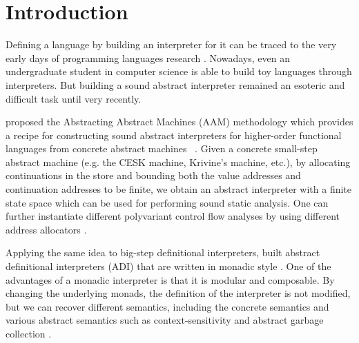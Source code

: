 \documentclass[acmsmall]{acmart}\settopmatter{}
\begin{document}


\maketitle


\section{Introduction}

Defining a language by building an interpreter for it can be traced to the very
early days of programming languages research \cite{landin1966next, reynolds1972definitional}.
Nowadays, even an undergraduate student in computer science is able to build toy languages
through interpreters.
But building a sound abstract interpreter remained an esoteric and difficult task until very recently.

\citeauthor{van2012systematic} proposed the Abstracting Abstract Machines (AAM) methodology which provides a recipe
for constructing sound abstract interpreters for higher-order functional languages from concrete abstract machines
~\cite{van2012systematic, van2010abstracting}.
Given a concrete small-step abstract machine (e.g. the CESK machine, Krivine's machine, etc.),
by allocating continuations in the store and bounding both the value addresses and continuation
addresses to be finite, we obtain an abstract interpreter with a finite state space which
can be used for performing sound static analysis.
One can further instantiate different polyvariant control flow analyses by using different address allocators \cite{Gilray:2016:ACP:2951913.2951936}.

Applying the same idea to big-step definitional interpreters, \citeauthor{darais2017abstracting}
built abstract definitional interpreters (ADI) that are written in monadic style \cite{darais2017abstracting}.
One of the advantages of a monadic interpreter is that it is modular and composable.
By changing the underlying monads, the definition of the interpreter is not modified,
but we can recover different semantics, including the concrete semantics and various
abstract semantics such as context-sensitivity and abstract garbage collection \cite{Sergey:2013:MAI:2491956.2491979}.
\end{document}
